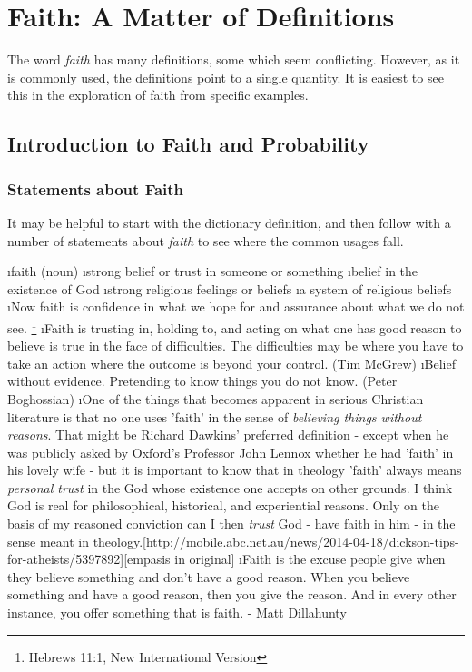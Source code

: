 \chapter{Faith: A Matter of Definitions}\label{ch:faith}

The word {\em faith} has many definitions, some which seem conflicting.  However, as it is commonly used, the definitions point to a single quantity.  It is easiest to see this in the exploration of faith from specific examples.

\section{Introduction to Faith and Probability}

\subsection{Statements about Faith}

It may be helpful to start with the dictionary definition, and then follow with a number of statements about {\em faith} to see where the common usages fall.

\bi
\i faith (noun)\cite{MerriamWebster2009}
    \bi
    \i strong belief or trust in someone or something
    \i belief in the existence of God
    \i strong religious feelings or beliefs
    \i a system of religious beliefs
    \ei
\i Now faith is confidence in what we hope for and assurance about what we do not see. \footnote{Hebrews 11:1, New International Version}
\i Faith is trusting in, holding to, and acting on what one has
good reason to believe is true in the face of difficulties. The
difficulties may be where you have to take an action where the outcome
is beyond your control. (Tim McGrew)\cite{Brierley:2014aa}
\i Belief without evidence.  Pretending to know things you do not know. (Peter Boghossian)\cite{Brierley:2014aa}
\i One of the things that becomes apparent in serious Christian literature is that no one uses 'faith' in the sense of {\em believing things without reasons}. That might be Richard Dawkins' preferred definition - except when he was publicly asked by Oxford's Professor John Lennox whether he had 'faith' in his lovely wife - but it is important to know that in theology 'faith' always means {\em personal trust} in the God whose existence one accepts on other grounds. I think God is real for philosophical, historical, and experiential reasons. Only on the basis of my reasoned conviction can I then {\em trust} God - have faith in him - in the sense meant in theology.[http://mobile.abc.net.au/news/2014-04-18/dickson-tips-for-atheists/5397892][empasis in original]
\i Faith is the excuse people give when they believe something and don't have a good reason. When you believe something and have a good reason, then you give the reason. And in every other instance, you offer something that is faith. - Matt Dillahunty
\ei

